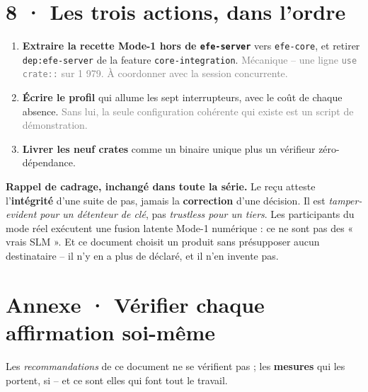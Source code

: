 \documentclass[10pt]{article}
\newcommand{\sz}[1]{\textcolor{grey}{\small\textsf{#1}}}
\newcommand{\code}[1]{\texttt{\small #1}}
\begin{document}
\section{8 · Les trois actions, dans l'ordre}

\begin{enumerate}[leftmargin=1.6em,itemsep=2pt,topsep=2pt]
\item \textbf{Extraire la recette Mode-1 hors de \code{efe-server}} vers \code{efe-core}, et retirer
      \code{dep:efe-server} de la feature \code{core-integration}. \sz{Mécanique -- une ligne
      \code{use crate::} sur 1 979. À coordonner avec la session concurrente.}
\item \textbf{Écrire le profil} qui allume les sept interrupteurs, avec le coût de chaque absence.
      \sz{Sans lui, la seule configuration cohérente qui existe est un script de démonstration.}
\item \textbf{Livrer les neuf crates} comme un binaire unique plus un vérifieur zéro-dépendance.
\end{enumerate}

\begin{these}
\small\textbf{Rappel de cadrage, inchangé dans toute la série.} Le reçu atteste l'\textbf{intégrité}
d'une suite de pas, jamais la \textbf{correction} d'une décision. Il est \emph{tamper-evident pour un
détenteur de clé}, pas \emph{trustless pour un tiers}. Les participants du mode réel exécutent une
fusion latente Mode-1 numérique : ce ne sont pas des « vrais SLM ». Et ce document choisit un produit
sans présupposer aucun destinataire -- il n'y en a plus de déclaré, et il n'en invente pas.
\end{these}

\section{Annexe · Vérifier chaque affirmation soi-même}

Les \emph{recommandations} de ce document ne se vérifient pas ; les \textbf{mesures} qui les portent,
si -- et ce sont elles qui font tout le travail.
\end{document}
